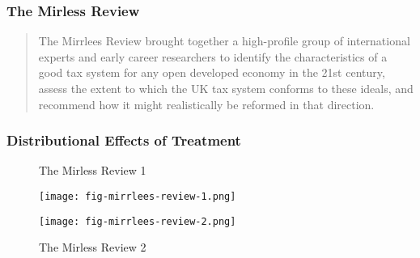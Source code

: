 
\begin{frame}
\frametitle{The Mirless Review}

\begin{quote}
The Mirrlees Review brought together a high-profile group of
international experts and early career researchers to identify the
characteristics of a good tax system for any open developed economy in
the 21st century, assess the extent to which the UK tax system conforms
to these ideals, and recommend how it might realistically be reformed in
that direction.
\end{quote}
\end{frame}


\begin{frame}
\frametitle{Distributional Effects of Treatment}

\begin{figure}[htp]
\vspace*{-0.5cm}
\centering
\begin{minipage}[t]{0.4\textwidth}
  \centering
  \caption{The Mirless Review 1}\label{The Mirless Review 1}
  \texttt{[image: fig-mirrlees-review-1.png]}
\end{minipage}%
\hfill
\begin{minipage}[t]{0.4\textwidth}
  \centering
   \caption{The Mirless Review 2}\label{The Mirless Review 2}
   \texttt{[image: fig-mirrlees-review-2.png]}
\end{minipage}
\end{figure}
\end{frame}



